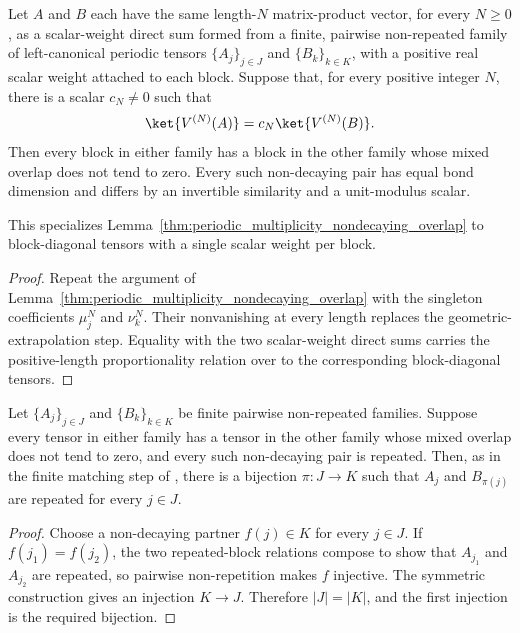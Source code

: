 \begin{lemma}
    \label{thm:periodic_scalar_weight_nondecaying_overlap}
    \leanok
    Let $A$ and $B$ each have the same length-$N$ matrix-product vector, for
    every $N\geq0$, as a scalar-weight direct sum formed from a finite,
    pairwise non-repeated family of left-canonical periodic tensors
    $\{A_j\}_{j\in J}$ and $\{B_k\}_{k\in K}$, with a positive real scalar
    weight attached to each block. Suppose that, for every positive integer
    $N$, there is a scalar $c_N\ne0$ such that
    \begin{align}
        \ket{V^{(N)}(A)}=c_N\ket{V^{(N)}(B)}.
        \notag
    \end{align}
    Then every block in either family has a block in the other family whose
    mixed overlap does not tend to zero.  Every such non-decaying pair has
    equal bond dimension and differs by an invertible similarity and a
    unit-modulus scalar.

    This specializes Lemma~\ref{thm:periodic_multiplicity_nondecaying_overlap}
    to block-diagonal tensors with a single scalar weight per block.
\end{lemma}
\begin{proof}\leanok
    Repeat the argument of
    Lemma~\ref{thm:periodic_multiplicity_nondecaying_overlap} with the
    singleton coefficients $\mu_j^N$ and $\nu_k^N$.  Their nonvanishing at
    every length replaces the geometric-extrapolation step.  Equality with the
    two scalar-weight direct sums carries the positive-length
    proportionality relation over to the corresponding block-diagonal tensors.
\end{proof}

\begin{lemma}
    \label{thm:periodic_conditional_block_matching}
    \leanok
    Let $\{A_j\}_{j\in J}$ and $\{B_k\}_{k\in K}$ be finite pairwise
    non-repeated families. Suppose every tensor in either family has a tensor
    in the other family whose mixed overlap does not tend to zero, and every
    such non-decaying pair is repeated. Then, as in the finite matching step of
    \cite[Theorem~3.4]{DeLasCuevas2017Irreducible}, there is a bijection
    $\pi\colon J\to K$ such that $A_j$ and $B_{\pi(j)}$ are repeated for every
    $j\in J$.
\end{lemma}
\begin{proof}\leanok
    Choose a non-decaying partner $f(j)\in K$ for every $j\in J$. If
    $f(j_1)=f(j_2)$, the two repeated-block relations compose to show that
    $A_{j_1}$ and $A_{j_2}$ are repeated, so pairwise non-repetition makes $f$
    injective. The symmetric construction gives an injection $K\to J$.
    Therefore $|J|=|K|$, and the first injection is the required bijection.
\end{proof}

